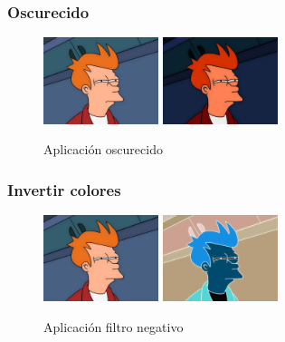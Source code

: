 \subsubsection{Oscurecido}
\vskip0.3cm
\begin{figure}[H]
 \centering
  \includegraphics[width=0.3\textwidth]{imagenes/Fry.jpg}
  \includegraphics[width=0.3\textwidth]{imagenes/fryOscurecido.jpg}
 \caption{Aplicación oscurecido}
 \label{diseño}
\end{figure}
\subsubsection{Invertir colores}
\vskip0.3cm
\begin{figure}[H]
 \centering
  \includegraphics[width=0.3\textwidth]{imagenes/Fry.jpg}
  \includegraphics[width=0.3\textwidth]{imagenes/fryNegativo.jpg}
 \caption{Aplicación filtro negativo}
 \label{diseño}
\end{figure}
